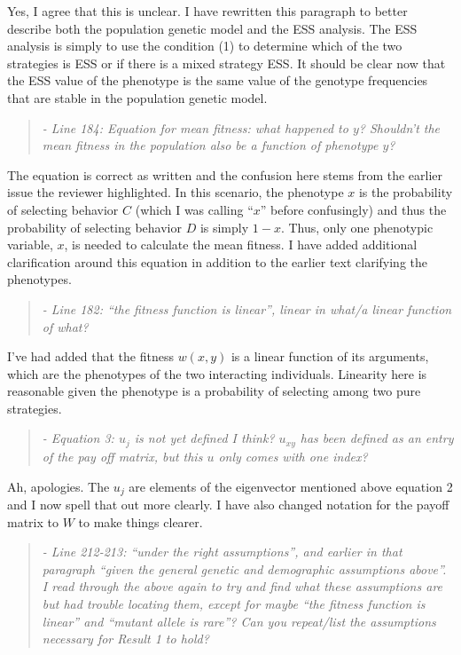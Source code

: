 \documentclass[10pt,parskip=full,foldmarks=off,addrfield=off,backaddress=false,refline=dateleft,letterpaper]{scrlttr2}
\newenvironment{reviewerquote}{\begin{quote}\color{DarkBlue}\itshape}{\end{quote}}
\begin{document}
\begin{letter}
Yes, I agree that this is unclear. I have rewritten this paragraph to better describe both the population genetic model and the ESS analysis. The ESS analysis is simply to use the condition (1) to determine which of the two strategies is ESS or if there is a mixed strategy ESS. It should be clear now that the ESS value of the phenotype is the same value of the genotype frequencies that are stable in the population genetic model.

\begin{reviewerquote}
  - Line 184: Equation for mean fitness: what happened to $y$? Shouldn’t the mean fitness in the population also be a function of phenotype $y$?
\end{reviewerquote}

The equation is correct as written and the confusion here stems from the earlier issue the reviewer highlighted. In this scenario, the phenotype $x$ is the probability of selecting behavior $C$ (which I was calling ``$x$'' before confusingly) and thus the probability of selecting behavior $D$ is simply $1-x$. Thus, only one phenotypic variable, $x$, is needed to calculate the mean fitness. I have added additional clarification around this equation in addition to the earlier text clarifying the phenotypes.

\begin{reviewerquote}
  - Line 182: “the fitness function is linear”, linear in what/a linear function of what?
\end{reviewerquote}

I've had added that the fitness $w(x,y)$ is a linear function of its arguments, which are the phenotypes of the two interacting individuals. Linearity here is reasonable given the phenotype is a probability of selecting among two pure strategies.

\begin{reviewerquote}
  - Equation 3: $u_j$ is not yet defined I think? $u_{xy}$ has been defined as an entry of the pay off matrix, but this $u$ only comes with one index?
\end{reviewerquote}

Ah, apologies. The $u_{j}$ are elements of the eigenvector mentioned above equation 2 and I now spell that out more clearly. I have also changed notation for the payoff matrix to $W$ to make things clearer.

\begin{reviewerquote}
  - Line 212-213: “under the right assumptions”, and earlier in that paragraph “given the general genetic and demographic assumptions above”. I read through the above again to try and find what these assumptions are but had trouble locating them, except for maybe “the fitness function is linear” and “mutant allele is rare”? Can you repeat/list the assumptions necessary for Result 1 to hold?
\end{reviewerquote}


\end{letter}
\end{document}
